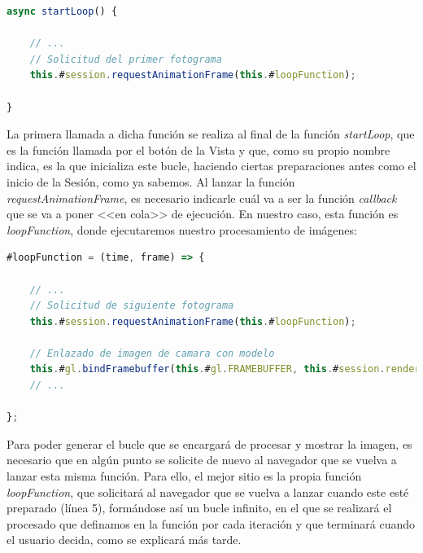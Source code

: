 \documentclass{subfiles}
\begin{document}
\begin{lstlisting}[language=JavaScript, caption={Función que solicita la carga del siguiente fotograma.}, label={lst:2.5}]
async startLoop() {

    // ...
    // Solicitud del primer fotograma
    this.#session.requestAnimationFrame(this.#loopFunction);
    
}
\end{lstlisting}

        La primera llamada a dicha función se realiza al final de la función \textit{startLoop}, que es la función llamada por el botón de la Vista y que, como su propio nombre indica, es la que inicializa este bucle, haciendo ciertas preparaciones antes como el inicio de la Sesión, como ya sabemos. Al lanzar la función \textit{requestAnimationFrame}, es necesario indicarle cuál va a ser la función \textit{callback} que se va a poner <<en cola>> de ejecución. En nuestro caso, esta función es \textit{loopFunction}, donde ejecutaremos nuestro procesamiento de imágenes:

\begin{lstlisting}[language=JavaScript, caption={Función bucle con el contenido mínimo}, label={lst:2.6}]
#loopFunction = (time, frame) => {

    // ...
    // Solicitud de siguiente fotograma
    this.#session.requestAnimationFrame(this.#loopFunction);

    // Enlazado de imagen de camara con modelo
    this.#gl.bindFramebuffer(this.#gl.FRAMEBUFFER, this.#session.renderState.baseLayer.framebuffer);
    // ...
    
};
\end{lstlisting}

        Para poder generar el bucle que se encargará de procesar y mostrar la imagen, es necesario que en algún punto se solicite de nuevo al navegador que se vuelva a lanzar esta misma función. Para ello, el mejor sitio es la propia función \textit{loopFunction}, que solicitará al navegador que se vuelva a lanzar cuando este esté preparado (línea 5), formándose así un bucle infinito, en el que se realizará el procesado que definamos en la función por cada iteración y que terminará cuando el usuario decida, como se explicará más tarde.
\end{document}
